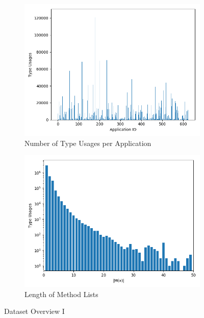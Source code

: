 \begin{figure}[t]
    \centering
    \begin{subfigure}[h]{0.49\textwidth}
        \centering
        \includegraphics[width=\textwidth]{figures/graph_tus_app}
        \caption{Number of Type Usages per Application}\label{fig:tus_app}
    \end{subfigure}
    \begin{subfigure}[h]{0.49\textwidth}
        \centering
        \includegraphics[width=\textwidth]{figures/graph_method_list}
        \caption{Length of Method Lists}\label{fig:method_list}
    \end{subfigure}
    \caption{Dataset Overview I}
\end{figure}

